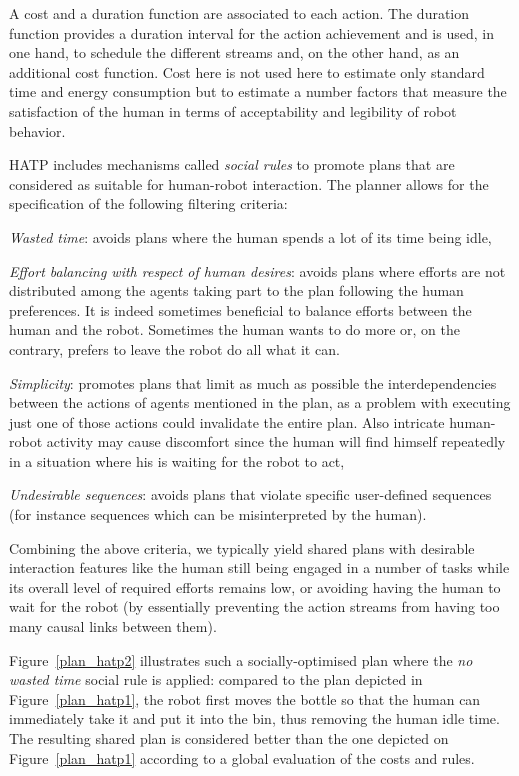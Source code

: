 \documentclass[preprint,3p,times]{elsarticle}
\begin{document}
A cost and a duration function are associated to each action.  The duration
function provides a duration interval for the action achievement and is used, in
one hand, to schedule the different streams and, on the other hand, as an
additional cost function. Cost here is not used here to estimate only standard time and energy consumption but
to estimate a number factors that measure the satisfaction of the human in terms of acceptability and legibility of robot behavior.  

HATP includes mechanisms called \emph{social rules} to promote plans that are
considered as suitable for human-robot interaction. The planner
allows for the specification of the following filtering criteria:

\emph{Wasted time}: avoids plans where the human spends a lot
of its time being idle,

\emph{Effort balancing with respect of human desires}: avoids plans where efforts are
not distributed among the agents taking part to the plan following the human preferences.  It is
indeed sometimes beneficial to balance efforts between the human and
the robot. Sometimes the human wants to do more or, on the contrary, prefers to leave the 
robot do all what it can. 

\emph{Simplicity}: promotes plans that limit as much as possible the interdependencies
between the actions of agents mentioned in the plan, as a problem with
executing just one of those actions could invalidate the entire
plan. Also intricate human-robot activity may cause discomfort since
the human will find himself repeatedly in a situation where his is
waiting for the robot to act,

\emph{Undesirable sequences}: avoids plans that violate specific user-defined
sequences (for instance sequences which can be misinterpreted by the human).

Combining the above criteria, we typically yield shared plans with desirable
interaction features like the human still being engaged in a number of tasks
while its overall level of required efforts remains low, or avoiding having the
human to wait for the robot (by essentially preventing the action streams from
having too many causal links between them).

Figure~\ref{plan_hatp2} illustrates such a socially-optimised plan where the
\emph{no wasted time} social rule is applied: compared to the plan depicted in
Figure~\ref{plan_hatp1}, the robot first moves the bottle so that the human can
immediately take it and put it into the bin, thus removing the human idle time.
The resulting shared plan is considered better than the one depicted on
Figure~\ref{plan_hatp1} according to a global evaluation of the costs and rules.
\end{document}

